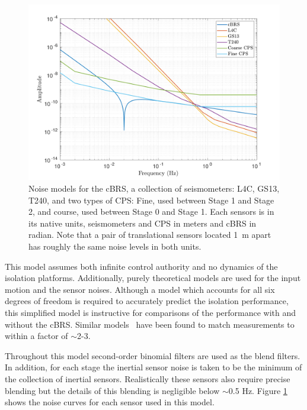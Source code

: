 \documentclass [12pt, proquest]{uwthesis}[2019]
\begin{document}
\begin{figure}[!h]
\begin{center}
\includegraphics[width=\textwidth]{cBRS_Model_Noise.pdf}
\caption[Noise models for the cBRS, a collection of seismometers, and two types of CPS]{Noise models for the cBRS, a collection of seismometers: L4C, GS13, T240, and two types of CPS: Fine, used between Stage 1 and Stage 2, and course, used between Stage 0 and Stage 1. Each sensors is in its native units, seismometers and CPS in meters and cBRS in radian. Note that a pair of translational sensors located 1~m apart has roughly the same noise levels in both units.}
\label{sensNoise}
\end{center}
\end{figure}

This model assumes both infinite control authority and no dynamics of the isolation platforms. Additionally, purely theoretical models are used for the input motion and the sensor noises. Although a model which accounts for all six degrees of freedom is required to accurately predict the isolation performance, this simplified model is instructive for comparisons of the performance with and without the cBRS. Similar models~\cite{windproofing} have been found to match measurements to within a factor of $\sim$2-3.

Throughout this model second-order binomial filters are used as the blend filters. In addition, for each stage the inertial sensor noise is taken to be the minimum of the collection of inertial sensors. Realistically these sensors also require precise blending but the details of this blending is negligible below $\sim$0.5 Hz. Figure \ref{sensNoise} shows the noise curves for each sensor used in this model.
\end{document}
